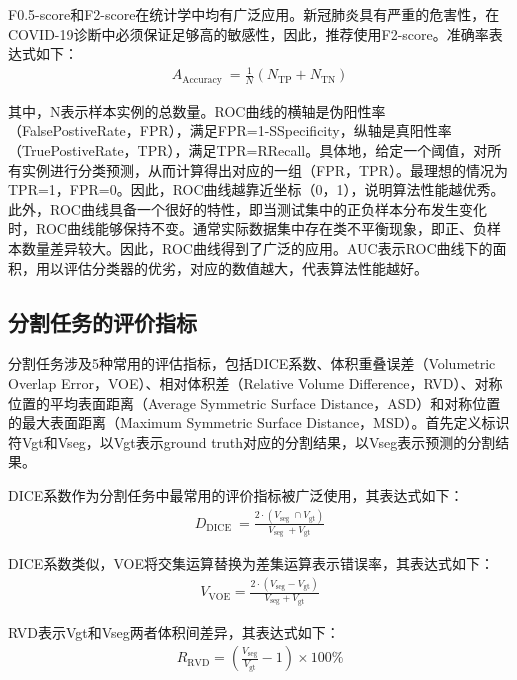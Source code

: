 \documentclass[journal,twoside,web]{ieeecolor}
\begin{document}
F0.5-score和F2-score在统计学中均有广泛应用。新冠肺炎具有严重的危害性，在COVID-19诊断中必须保证足够高的敏感性，因此，推荐使用F2-score。准确率表达式如下：
\begin{equation}
\begin{array}{l}
A_{\text {Accuracy }}=\frac{1}{N}\left(N_{\mathrm{TP}}+N_{\mathrm{TN}}\right)
\end{array}
\end{equation}

其中，N表示样本实例的总数量。ROC曲线的横轴是伪阳性率（FalsePostiveRate，FPR），满足FPR=1-SSpecificity，纵轴是真阳性率（TruePostiveRate，TPR），满足TPR=RRecall。具体地，给定一个阈值，对所有实例进行分类预测，从而计算得出对应的一组（FPR，TPR）。最理想的情况为TPR=1，FPR=0。因此，ROC曲线越靠近坐标（0，1），说明算法性能越优秀。此外，ROC曲线具备一个很好的特性，即当测试集中的正负样本分布发生变化时，ROC曲线能够保持不变。通常实际数据集中存在类不平衡现象，即正、负样本数量差异较大。因此，ROC曲线得到了广泛的应用。AUC表示ROC曲线下的面积，用以评估分类器的优劣，对应的数值越大，代表算法性能越好。
\subsection{分割任务的评价指标}
分割任务涉及5种常用的评估指标，包括DICE系数、体积重叠误差（Volumetric Overlap Error，VOE）、相对体积差（Relative Volume Difference，RVD）、对称位置的平均表面距离（Average Symmetric Surface Distance，ASD）和对称位置的最大表面距离（Maximum Symmetric Surface Distance，MSD）。首先定义标识符Vgt和Vseg，以Vgt表示ground truth对应的分割结果，以Vseg表示预测的分割结果。

DICE系数作为分割任务中最常用的评价指标被广泛使用，其表达式如下：
\begin{equation}
\begin{array}{l}
    D_{\text {DICE }}=\frac{2 \cdot\left(V_{\text {seg }} \cap V_{\mathrm{gt}}\right)}{V_{\text {seg }}+V_{\mathrm{gt}}}
\end{array}
\end{equation}

DICE系数类似，VOE将交集运算替换为差集运算表示错误率，其表达式如下：
\begin{equation}
\begin{array}{l}
V_{\mathrm{VOE}}=\frac{2 \cdot\left(V_{\mathrm{seg}}-V_{\mathrm{gt}}\right)}{V_{\mathrm{seg}}+V_{\mathrm{gt}}}
\end{array}
\end{equation}

RVD表示Vgt和Vseg两者体积间差异，其表达式如下：
\begin{equation}
\begin{array}{l}
R_{\mathrm{RVD}}=\left(\frac{V_{\mathrm{seg}}}{V_{\mathrm{gt}}}-1\right) \times 100 \%
\end{array}
\end{equation}
\end{document}
